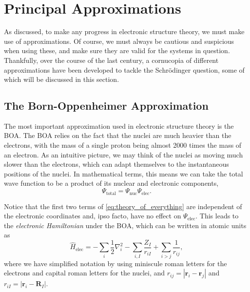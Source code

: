 \section{Principal Approximations}

As discussed, to make any progress in electronic structure theory, we must make use of approximations. Of course, we must always be cautious and suspicious when using these, and make sure they are valid for the systems in question. Thankfully, over the course of the last century, a cornucopia of different approximations have been developed to tackle the Schr\"odinger question, some of which will be discussed in this section.

\subsection{The Born-Oppenheimer Approximation}

The most important approximation used in electronic structure theory is the \gls{BOA}. The \gls{BOA} relies on the fact that the nuclei are much heavier than the electrons, with the mass of a single proton being almost 2000 times the mass of an electron. As an intuitive picture, we may think of the nuclei as moving much slower than the electrons, which can adapt themselves to the instantaneous positions of the nuclei. In mathematical terms, this means we can take the total wave function to be a product of its nuclear and electronic components,
\begin{equation}
    \Psi_\mathrm{total} = \Psi_\mathrm{nuc} \Psi_\mathrm{elec}.
\end{equation}

Notice that the first two terms of \ref{eq:theory_of_everything} are independent of the electronic coordinates and, ipso facto, have no effect on $\Psi_\mathrm{elec}$. This leads to the \emph{electronic Hamiltonian} under the \gls{BOA}, which can be written in atomic units as
\begin{equation}
\label{eq:elec_hamiltonian}
\hat H_\mathrm{elec} = -\sum_{i} \frac{1}{2} \nabla_i^2 - \sum_{i,I} \frac{Z_I}{r_{iI}} + \sum_{i\gt j} \frac{1}{r_{ij}},
\end{equation}
where we have simplified notation by using miniscule roman letters for the electrons and capital roman letters for the nuclei, and $r_{ij}=|\mathbf{r}_i-\mathbf{r}_j|$ and $r_{iI}=|\mathbf{r}_i-\mathbf{R}_I|$.

